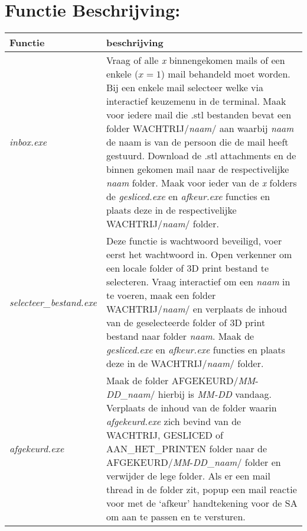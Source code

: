 \documentclass{article}
\begin{document}
\section*{\hspace{-1cm}Functie Beschrijving:}


\begin{table}[H]
\hspace{-2cm}
    \begin{tabular}%
    {>{\raggedright\arraybackslash}p{}%
    |>{\raggedright\arraybackslash}p{}}
    \rowcolor{myblue}
    Functie & beschrijving\\\hline

  \textit{inbox.exe}& Vraag of alle \textit{x} binnengekomen mails of een enkele ($x=1$) mail behandeld moet worden. Bij een enkele mail selecteer welke via interactief keuzemenu in de terminal. Maak voor iedere mail die .stl bestanden bevat een folder WACHTRIJ/\textit{naam}/ aan waarbij \textit{naam} de naam is van de persoon die de mail heeft gestuurd. Download de .stl attachments en de binnen gekomen mail naar de respectivelijke \textit{naam} folder. Maak voor ieder van de \textit{x} folders de \textit{gesliced.exe} en \textit{afkeur.exe} functies en plaats deze in de respectivelijke WACHTRIJ/\textit{naam}/ folder.\\

\textit{selecteer\_bestand.exe}& Deze functie is wachtwoord beveiligd, voer eerst het wachtwoord in. Open verkenner om een locale folder of 3D print bestand te selecteren. Vraag interactief om een \textit{naam} in te voeren, maak een folder WACHTRIJ/\textit{naam}/ en verplaats de inhoud van de geselecteerde folder of 3D print bestand naar folder \textit{naam}. Maak de \textit{gesliced.exe} en \textit{afkeur.exe} functies en plaats deze in de WACHTRIJ/\textit{naam}/ folder.\\

\textit{afgekeurd.exe}& 
Maak de folder AFGEKEURD/\textit{MM}-\textit{DD}\_\textit{naam}/ hierbij is \textit{MM-DD} vandaag. Verplaats de inhoud van de folder waarin \textit{afgekeurd.exe} zich bevind van de WACHTRIJ, GESLICED of AAN\_HET\_PRINTEN folder naar de AFGEKEURD/\textit{MM}-\textit{DD}\_\textit{naam}/ folder en verwijder de lege folder. Als er een mail thread in de folder zit, popup een mail reactie voor met de `afkeur' handtekening voor de SA om aan te passen en te versturen.\\


\end{tabular}
\end{table}
\end{document}
